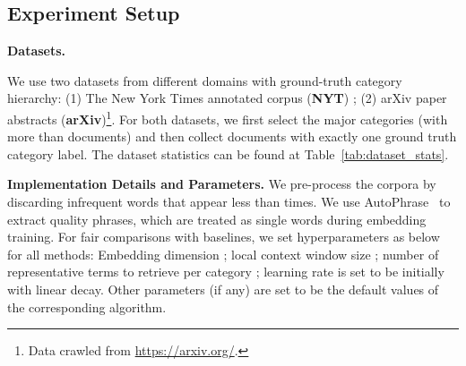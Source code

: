 \documentclass[sigconf]{acmart}
\theoremstyle{definition}
\begin{document}
\subsection{Experiment Setup}
\noindent
\textbf{Datasets.}
\begin{table}[t]
\centering
\caption{Dataset statistics.}
\label{tab:dataset_stats}
\end{table}
We use two datasets from different domains with ground-truth category hierarchy: (1) The New York Times annotated corpus (\textbf{NYT}) \cite{Sandhaus2008}; (2) arXiv paper abstracts (\textbf{arXiv})\footnote{Data crawled from \url{https://arxiv.org/}.}.
For both datasets, we first select the major categories (with more than  documents) and then collect documents with exactly one ground truth category label. The dataset statistics can be found at Table~\ref{tab:dataset_stats}.

\noindent
\textbf{Implementation Details and Parameters.}
We pre-process the corpora by discarding infrequent words that appear less than  times. We use AutoPhrase~\cite{Shang2018AutomatedPM} to extract quality phrases, which are treated as single words during embedding training.
For fair comparisons with baselines, we set hyperparameters as below for all methods: Embedding dimension ; local context window size ; number of representative terms to retrieve per category ; learning rate  is set to be  initially with linear decay. Other parameters (if any) are set to be the default values of the corresponding algorithm.
\end{document}
